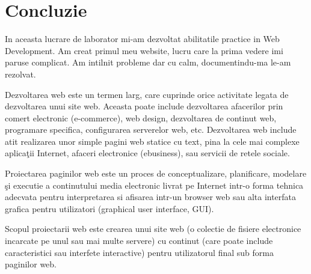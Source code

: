 \section*{Concluzie}

In aceasta lucrare de laborator mi-am dezvoltat abilitatile practice in Web Development. Am creat primul meu website, lucru care la prima vedere imi paruse complicat. Am intilnit probleme dar cu calm, documentindu-ma le-am rezolvat.

Dezvoltarea web este un termen larg, care cuprinde orice activitate legata de dezvoltarea unui site web. Aceasta poate include dezvoltarea afacerilor prin comert electronic (e-commerce), web design, dezvoltarea de continut web, programare specifica, configurarea serverelor web, etc. Dezvoltarea web include atit realizarea unor simple pagini web statice cu text, pina la cele mai complexe aplicaţii Internet, afaceri electronice (ebusiness), sau servicii de retele sociale.


Proiectarea paginilor web este un proces de conceptualizare, planificare, modelare şi executie a continutului media electronic livrat pe Internet intr-o forma tehnica adecvata pentru interpretarea si afisarea intr-un browser web sau alta interfata grafica pentru utilizatori (graphical user interface, GUI).

Scopul proiectarii web este crearea unui site web (o colectie de fisiere electronice incarcate pe unul sau mai multe servere) cu continut (care poate include caracteristici sau interfete interactive) pentru utilizatorul final sub forma paginilor web.
\clearpage
